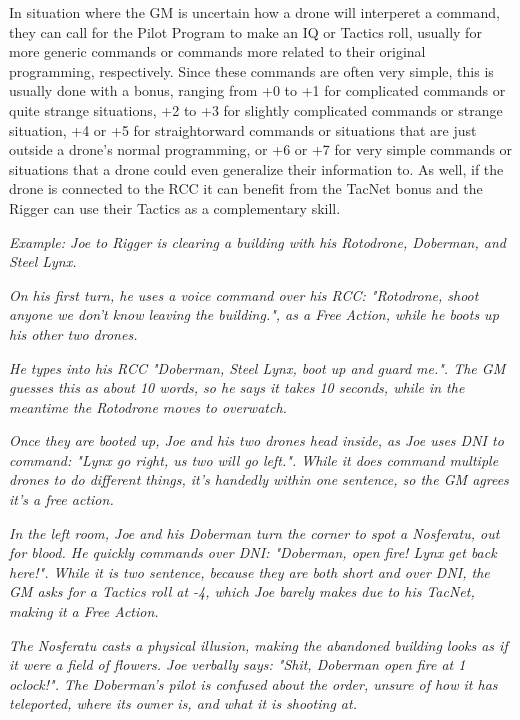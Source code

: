 \begin{multicols*}{3}
	In situation where the GM is uncertain how a drone will interperet a command, they can call for the Pilot Program to make an IQ or Tactics roll, usually for more generic commands or commands more related to their original programming, respectively. Since these commands are often very simple, this is usually done with a bonus, ranging from +0 to +1 for complicated commands or quite strange situations, +2 to +3 for slightly complicated commands or strange situation, +4 or +5 for straightorward commands or situations that are just outside a drone's normal programming, or +6 or +7 for very simple commands or situations that a drone could even generalize their information to. As well, if the drone is connected to the RCC it can benefit from the TacNet bonus and the Rigger can use their Tactics as a complementary skill.
	
	\textcolor{OliveGreen}{\textit{Example: Joe to Rigger is clearing a building with his Rotodrone, Doberman, and Steel Lynx.}}
	
	\textcolor{OliveGreen}{\textit{On his first turn, he uses a voice command over his RCC: "Rotodrone, shoot anyone we don't know leaving the building.", as a Free Action, while he boots up his other two drones.}}
	
	\textcolor{OliveGreen}{\textit{He types into his RCC "Doberman, Steel Lynx, boot up and guard me.". The GM guesses this as about 10 words, so he says it takes 10 seconds, while in the meantime the Rotodrone moves to overwatch.}}
	
	\textcolor{OliveGreen}{\textit{Once they are booted up, Joe and his two drones head inside, as Joe uses DNI to command: "Lynx go right, us two will go left.". While it does command multiple drones to do different things, it's handedly within one sentence, so the GM agrees it's a free action.}}
	
	\textcolor{OliveGreen}{\textit{In the left room, Joe and his Doberman turn the corner to spot a Nosferatu, out for blood. He quickly commands over DNI: "Doberman, open fire! Lynx get back here!". While it is two sentence, because they are both short and over DNI, the GM asks for a Tactics roll at -4, which Joe barely makes due to his TacNet, making it a Free Action.}}
	
	\textcolor{OliveGreen}{\textit{The Nosferatu casts a physical illusion, making the abandoned building looks as if it were a field of flowers. Joe verbally says: "Shit, Doberman open fire at 1 oclock!". The Doberman's pilot is confused about the order, unsure of how it has teleported, where its owner is, and what it is shooting at.}}
	

\end{multicols*}
